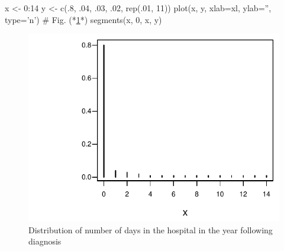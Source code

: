 \begin{Schunk}
\begin{Sinput}
x <- 0:14
y <- c(.8, .04, .03, .02, rep(.01, 11))
plot(x, y, xlab=xl, ylab='', type='n')   # Fig. (*\ref{fig:descript-orda}*)
segments(x, 0, x, y)
\end{Sinput}
\begin{figure}[htbp]

\centerline{\includegraphics{descript-orda-1} }

\caption[Count variable with clumping at zero]{Distribution of number of days in the hospital in the year following diagnosis}\label{fig:descript-orda}
\end{figure}
\end{Schunk}

